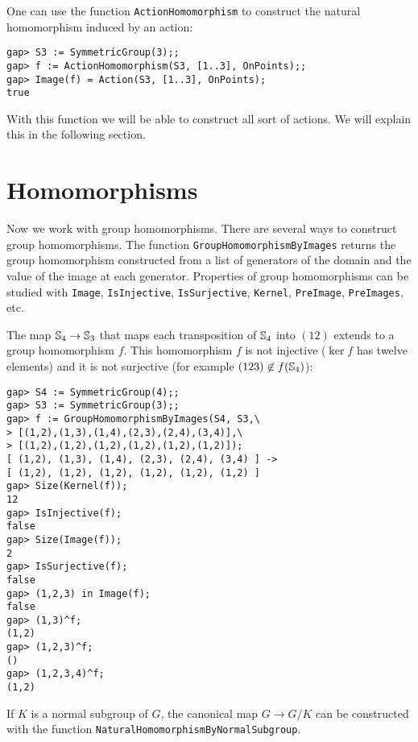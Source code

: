 One can use the function \lstinline{ActionHomomorphism} to construct
the natural homomorphism induced by an action:
\begin{lstlisting}
gap> S3 := SymmetricGroup(3);;
gap> f := ActionHomomorphism(S3, [1..3], OnPoints);;
gap> Image(f) = Action(S3, [1..3], OnPoints);
true
\end{lstlisting}
With this function we will be able to construct
all sort of actions. We will explain this in the following section.  

\section{Homomorphisms}

Now we work with group homomorphisms. There are several ways to construct group homomorphisms. The function
\lstinline{GroupHomomorphismByImages} returns the group homomorphism
constructed from a list of generators of the domain and the value of the image
at each generator. Properties of group homomorphisms can be studied with
\lstinline{Image}, \lstinline{IsInjective}, \lstinline{IsSurjective},
\lstinline{Kernel}, \lstinline{PreImage}, \lstinline{PreImages}, etc. 

\begin{example}
The map $\mathbb{S}_4\to\mathbb{S}_3$
that maps each transposition of $\mathbb{S}_4$ into $(12)$ extends to a group homomorphism $f$. 
This homomorphism $f$ is not injective ($\ker f$ has twelve elements) and it is
not surjective (for example $(123)\not\in f(\mathbb{S}_4)$):
\begin{lstlisting}
gap> S4 := SymmetricGroup(4);;
gap> S3 := SymmetricGroup(3);;
gap> f := GroupHomomorphismByImages(S4, S3,\
> [(1,2),(1,3),(1,4),(2,3),(2,4),(3,4)],\
> [(1,2),(1,2),(1,2),(1,2),(1,2),(1,2)]);
[ (1,2), (1,3), (1,4), (2,3), (2,4), (3,4) ] -> 
[ (1,2), (1,2), (1,2), (1,2), (1,2), (1,2) ]
gap> Size(Kernel(f));
12
gap> IsInjective(f);
false
gap> Size(Image(f));
2
gap> IsSurjective(f);
false
gap> (1,2,3) in Image(f);
false
gap> (1,3)^f;
(1,2)
gap> (1,2,3)^f;
()
gap> (1,2,3,4)^f;
(1,2)
\end{lstlisting}
\end{example}

If $K$ is a normal subgroup of $G$, the canonical map $G\to G/K$ can be
constructed with the function \lstinline{NaturalHomomorphismByNormalSubgroup}.

